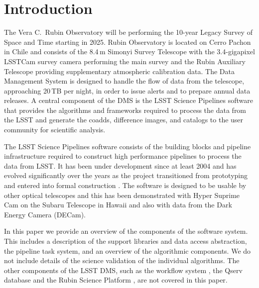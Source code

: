 \section{Introduction}

The Vera C.\ Rubin Observatory will be performing the 10-year Legacy Survey of Space and Time \citep[LSST;][]{2019ApJ...873..111I} starting in 2025.
Rubin Observatory is located on Cerro Pachon in Chile and consists of the 8.4\,m Simonyi Survey Telescope with the 3.4-gigapixel LSSTCam survey camera performing the main survey and the Rubin Auxiliary Telescope providing supplementary atmospheric calibration data.
The Data Management System \citep[DMS;][]{2022arXiv221113611O} is designed to handle the flow of data from the telescope, approaching 20\,TB per night, in order to issue alerts and to prepare annual data releases.
A central component of the DMS is the LSST Science Pipelines software that provides the algorithms and frameworks required to process the data from the LSST and generate the coadds, difference images, and catalogs to the user community for scientific analysis.

The LSST Science Pipelines software consists of the building blocks and pipeline infrastructure required to construct high performance pipelines to process the data from LSST.
It has been under development since at least 2004 \citep{2004AAS...20510811A} and has evolved significantly over the years as the project transitioned from prototyping \citep{2010SPIE.7740E..15A} and entered into formal construction \citep{2017ASPC..512..279J}.
The software is designed to be usable by other optical telescopes and this has been demonstrated with Hyper Suprime Cam on the Subaru Telescope in Hawaii \citep{2018PASJ...70S...5B} and also with data from the Dark Energy Camera (DECam).

In this paper we provide an overview of the components of the software system.
This includes a description of the support libraries and data access abstraction, the pipeline task system, and an overview of the algorithmic components.
We do not include details of the science validation of the individual algorithms.
The other components of the LSST DMS, such as the workflow system \citep{2022arXiv221115795G}, the Qserv database \citep{Wang:2011:QDS:2063348.2063364} and the Rubin Science Platform \citep{LSE-319}, are not covered in this paper.
